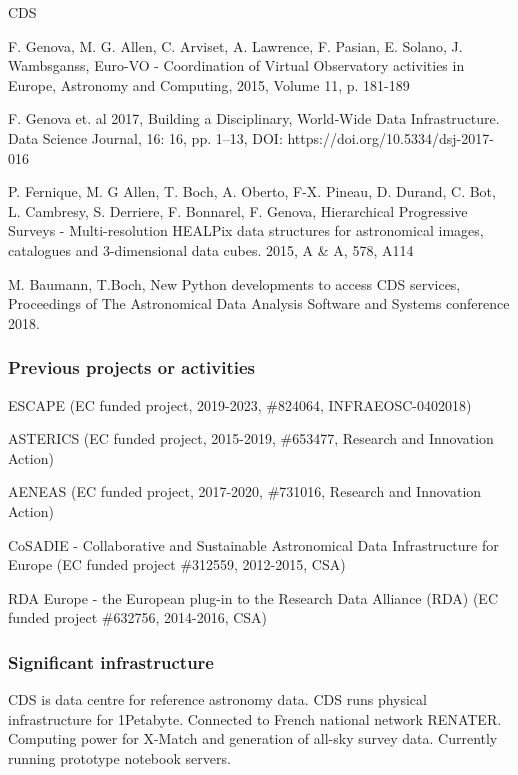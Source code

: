 \begin{sitedescription}{CDS}
\begin{compactenum}
  \item F. Genova, M. G. Allen, C. Arviset, A. Lawrence, F. Pasian, E. Solano, J. Wambsganss, Euro-VO - Coordination of Virtual Observatory activities in Europe, Astronomy and Computing, 2015, Volume 11, p. 181-189
  \item F. Genova et. al 2017, Building a Disciplinary, World‐Wide Data Infrastructure. Data Science Journal, 16: 16, pp. 1–13, DOI: https://doi.org/10.5334/dsj-2017-016
  \item P. Fernique, M. G Allen, T. Boch, A. Oberto, F-X. Pineau, D. Durand, C. Bot, L. Cambresy, S. Derriere, F. Bonnarel, F. Genova, Hierarchical Progressive Surveys - Multi-resolution HEALPix data structures for astronomical images, catalogues and 3-dimensional data cubes.  2015, A \& A, 578, A114 
  \item M. Baumann, T.Boch, New Python developments to access CDS services, Proceedings of The Astronomical Data Analysis Software and Systems conference 2018.
\end{compactenum}

\subsubsection*{Previous projects or activities}

\begin{compactenum}
  \item ESCAPE (EC funded project, 2019-2023, \#824064, INFRAEOSC-0402018)
  \item ASTERICS (EC funded project, 2015-2019, \#653477, Research and Innovation Action)
  \item AENEAS (EC funded project,  2017-2020, \#731016, Research and Innovation Action)
  \item CoSADIE - Collaborative and Sustainable Astronomical Data Infrastructure for Europe (EC funded project \#312559, 2012-2015, CSA)
  \item RDA Europe - the European plug-in to the Research Data Alliance (RDA) (EC funded project \#632756, 2014-2016, CSA)
\end{compactenum}

\subsubsection*{Significant infrastructure}

CDS is data centre for reference astronomy data. CDS runs physical infrastructure for 1Petabyte. Connected to French national network RENATER. Computing power for X-Match and generation of all-sky survey data. Currently running prototype notebook servers.


\end{sitedescription}
